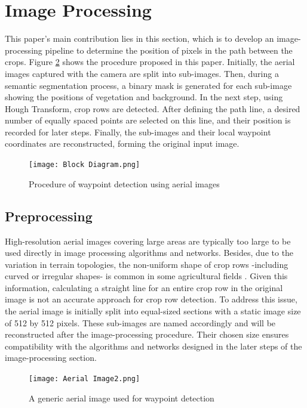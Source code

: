 \documentclass[conference]{IEEEtran}
\begin{document}
\section{Image Processing}\label{Image Processing}
This paper's main contribution lies in this section, which is to develop an image-processing pipeline to determine the position of pixels in the path between the crops. Figure 
\ref{fig1}
 shows the procedure proposed in this paper. Initially, the aerial images captured with the camera are split into sub-images. Then, during a semantic segmentation process, a binary mask is generated for each sub-image showing the positions of vegetation and background. In the next step, using Hough Transform, crop rows are detected. After defining the path line, a desired number of equally spaced points are selected on this line, and their position is recorded for later steps. Finally, the sub-images and their local waypoint coordinates are reconstructed, forming the original input image.

\begin{figure}[htbp]
\texttt{[image: Block Diagram.png]}
\caption{Procedure of waypoint detection using aerial images
\cite{b5}}
\label{fig1}
\end{figure}

\subsection{Preprocessing}\label{Preprocessing}
High-resolution aerial images covering large areas are typically too large to be used directly in image processing algorithms and networks. Besides, due to the variation in terrain topologies, the non-uniform shape of crop rows -including curved or irregular shapes- is common in some agricultural fields
\cite{b2, b3, b14}.
Given this information, calculating a straight line for an entire crop row in the original image is not an accurate approach for crop row detection.
To address this issue, the aerial image is initially split into equal-sized sections with a static image size of 512 by 512 pixels. These sub-images are named accordingly and will be reconstructed after the image-processing procedure. Their chosen size ensures compatibility with the algorithms and networks designed in the later steps of the image-processing section.


\begin{figure}[htbp]
\texttt{[image: Aerial Image2.png]}
\caption{A generic aerial image used for waypoint detection
\cite{b5}}
\label{fig1}
\end{figure}
\end{document}
